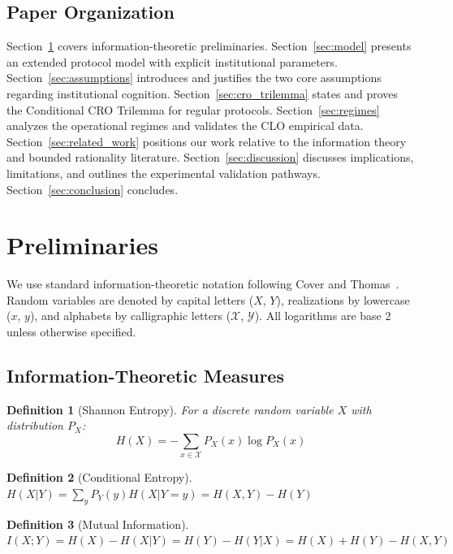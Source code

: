 \documentclass{ieeeaccess}
\newtheorem{definition}{Definition}[subsection]
\begin{document}
\subsection{Paper Organization}

Section~\ref{sec:preliminaries} covers information-theoretic preliminaries. Section~\ref{sec:model} presents an extended protocol model with explicit institutional parameters. Section~\ref{sec:assumptions} introduces and justifies the two core assumptions regarding institutional cognition. Section~\ref{sec:cro_trilemma} states and proves the Conditional CRO Trilemma for regular protocols. Section~\ref{sec:regimes} analyzes the operational regimes and validates the CLO empirical data. Section~\ref{sec:related_work} positions our work relative to the information theory and bounded rationality literature. Section~\ref{sec:discussion} discusses implications, limitations, and outlines the experimental validation pathways. Section~\ref{sec:conclusion} concludes.

\section{Preliminaries}\label{sec:preliminaries}

We use standard information-theoretic notation following Cover and Thomas~\cite{CoverThomas06}. Random variables are denoted by capital letters ($X$, $Y$), realizations by lowercase ($x$, $y$), and alphabets by calligraphic letters ($\mathcal{X}$, $\mathcal{Y}$). All logarithms are base 2 unless otherwise specified.

\subsection{Information-Theoretic Measures}

\begin{definition}[Shannon Entropy]\label{def:entropy}
For a discrete random variable $X$ with distribution $P_X$:
\begin{equation}
H(X) = -\sum_{x \in \mathcal{X}} P_X(x)\log P_X(x)
\end{equation}
\end{definition}

\begin{definition}[Conditional Entropy]\label{def:cond_entropy}
$H(X|Y) = \sum_{y} P_Y(y)H(X|Y=y) = H(X,Y) - H(Y)$
\end{definition}

\begin{definition}[Mutual Information]\label{def:mutual_info}
$I(X;Y) = H(X) - H(X|Y) = H(Y) - H(Y|X) = H(X) + H(Y) - H(X,Y)$
\end{definition}
\end{document}
